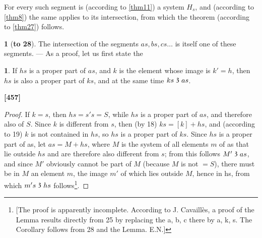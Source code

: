 \documentclass[leqno,hidelinks,a4paper]{article}
\theoremstyle{definition}
\newtheorem*{zusatz}{\protect\zusatzname}
\newtheorem*{hilfssatz}{\protect\hilfssatzname}
\newcommand{\zusatzname}{}
\newcommand{\hilfssatzname}{}
\renewcommand{\zusatzname}{Zusatz}%
\renewcommand{\hilfssatzname}{Hilfssatz}%
\renewcommand{\zusatzname}{Corollary}%
\renewcommand{\hilfssatzname}{Lemma}%
\newcommand\partof{\mathrel{\raisebox{0.45ex}{$\mathfrak{3}$}}}
\begin{document}
For every such segment is (according to \ref{thm11}) a system $H_s$, and (according to \ref{thm8}) the same applies to its intersection, from which the theorem (according to \ref{thm27}) follows.

\begin{zusatz}[\textbf{to 28}]
\label{cor_to_thm28}
The intersection of the segments $as, bs, cs \ldots$ is itself one of these segments. --- As a proof, let us first state the
\end{zusatz}

\begin{hilfssatz}
If $hs$ is a proper part of $as$, and $k$ is the element whose image is $k'=h$, then $hs$ is also a proper part of $ks$, and at the same time $ks \partof as$.
\end{hilfssatz}
\noindent \textbf{[457]}

\begin{proof}
If $k=s$, then $hs=s's= S$, while $hs$ is a proper part of $as$, and therefore also of $S$. Since $k$ is different from $s$, then (by 18) $ks =[k]+ hs$, and (according to 19) $k$ is not contained in $hs$, so $hs$ is a proper part of $ks$.
Since $hs$ is a proper part of as, let $as = M + hs$, where $M$ is the system of all elements $m$ of as that lie outside $hs$ and are therefore also different from $s$; from this follows $M' \partof as$, and since $M'$ obviously cannot be part of $M$ (because $M$ is not $= S$), there must be in $M$ an element $m$, the image $m'$ of which lies outside $M$, hence in hs, from which $m's \partof hs$ follows\footnote{[The proof is apparently incomplete. According to J. Cavaillès, a proof of the Lemma results directly from 25 by replacing the a, b, c there by a, k, s. The Corollary follows from 28 and the Lemma. E.N.]}.\end{proof}
\end{document}

